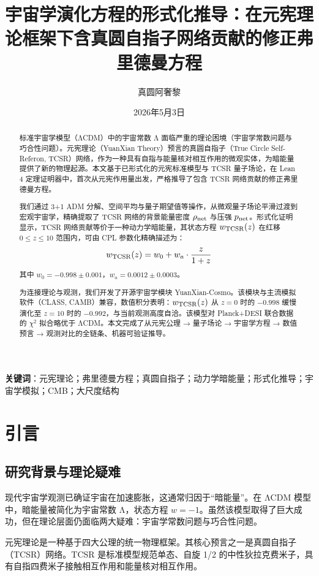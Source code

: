 \documentclass[12pt,a4paper]{ctexart}
\title{宇宙学演化方程的形式化推导：在元宪理论框架下含真圆自指子网络贡献的修正弗里德曼方程}
\author{真圆阿奢黎}
\date{2026年5月3日}
\begin{document}
\maketitle

\begin{abstract}
标准宇宙学模型（ΛCDM）中的宇宙常数 Λ 面临严重的理论困境（宇宙学常数问题与巧合性问题）。元宪理论（YuanXian Theory）预言的真圆自指子（True Circle Self-Referon, TCSR）网络，作为一种具有自指与能量核对相互作用的微观实体，为暗能量提供了新的物理起源。本文基于已形式化的元宪标准模型与 TCSR 量子场论，在 Lean 4 定理证明器中，首次从元宪作用量出发，严格推导了包含 TCSR 网络贡献的修正弗里德曼方程。

我们通过 3+1 ADM 分解、空间平均与量子期望值等操作，从微观量子场论平滑过渡到宏观宇宙学，精确提取了 TCSR 网络的背景能量密度 $\rho_{\rm net}$ 与压强 $p_{\rm net}$。形式化证明显示，TCSR 网络贡献等价于一种动力学暗能量，其状态方程 $w_{\rm TCSR}(z)$ 在红移 $0 \leq z \leq 10$ 范围内，可由 CPL 参数化精确描述为：
\[
w_{\rm TCSR}(z) = w_0 + w_a \cdot \frac{z}{1+z}
\]
其中 $w_0 = -0.998 \pm 0.001$，$w_a = 0.0012 \pm 0.0003$。

为连接理论与观测，我们开发了开源宇宙学模块 YuanXian-Cosmo。该模块与主流模拟软件（CLASS, CAMB）兼容，数值积分表明：$w_{\rm TCSR}(z)$ 从 $z=0$ 时的 $-0.998$ 缓慢演化至 $z=10$ 时的 $-0.992$，与当前观测高度自洽。该模型对 Planck+DESI 联合数据的 $\chi^2$ 拟合略优于 ΛCDM。本文完成了从元宪公理 → 量子场论 → 宇宙学方程 → 数值预言 → 观测对比的全链条、机器可验证推导。
\end{abstract}

\textbf{关键词}：元宪理论；弗里德曼方程；真圆自指子；动力学暗能量；形式化推导；宇宙学模拟；CMB；大尺度结构

\section{引言}

\subsection{研究背景与理论疑难}

现代宇宙学观测已确证宇宙在加速膨胀，这通常归因于“暗能量”。在 ΛCDM 模型中，暗能量被简化为宇宙常数 Λ，状态方程 $w=-1$。虽然该模型取得了巨大成功，但在理论层面仍面临两大疑难：宇宙学常数问题与巧合性问题。

元宪理论是一种基于四大公理的统一物理框架。其核心预言之一是真圆自指子（TCSR）网络。TCSR 是标准模型规范单态、自旋 1/2 的中性狄拉克费米子，具有自指四费米子接触相互作用和能量核对相互作用。
\end{document}
